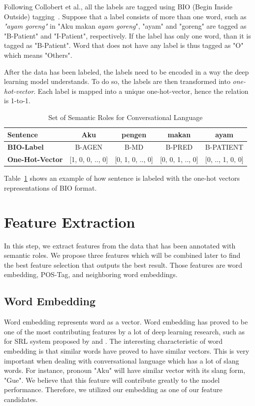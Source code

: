 Following Collobert et al., all the labels are tagged using BIO (Begin Inside Outside) tagging~\cite{collobert2011natural}. Suppose that a label \patient consists of more than one word, such as \textit{"ayam goreng"} in "Aku makan \textit{ayam goreng}", "ayam" and "goreng" are tagged as "B-Patient" and "I-Patient", respectively. If the label has only one word, than it is tagged as "B-Patient". Word that does not have any label is thus tagged as "O" which means "Others".

After the data has been labeled, the labels need to be encoded in a way the deep learning model understands. To do so, the labels are then transformed into \textit{one-hot-vector}. Each label is mapped into a unique one-hot-vector, hence the relation is 1-to-1.
\begin{table}
	\centering
	\caption{Set of Semantic Roles for Conversational Language}
	\label{tab:examplelabel}
	\begin{tabular}{|lcccc|}
		\hline
		\textbf{Sentence} 				& Aku & pengen & makan & ayam \\
		\hline
		\textbf{BIO-Label}				& B-AGEN & B-MD & B-PRED & B-PATIENT  \\
		\hline
		\textbf{One-Hot-Vector}		& [1, 0, 0, .., 0] & [0, 1, 0, .., 0] & [0, 0, 1, .., 0] & [0, .., 1, 0, 0] \\
		\hline
	\end{tabular}
\end{table}

Table~\ref{tab:examplelabel} shows an example of how sentence is labeled with the one-hot vectors representations of BIO format.

\section{Feature Extraction}
In this step, we extract features from the data that has been annotated with semantic roles. We propose three features which will be combined later to find the best feature selection that outputs the best result. Those features are word embedding, POS-Tag, and neighboring word embeddings.

\subsection{Word Embedding}
Word embedding represents word as a vector. Word embedding has proved to be one of the most contributing features by a lot of deep learning research, such as for SRL system proposed by \cite{zhou2015end} and \cite{collobert2011natural}. The interesting characteristic of word embedding is that similar words have proved to have similar vectors. This is very important when dealing with conversational language which has a lot of slang words. For instance, pronoun "Aku" will have similar vector with its slang form, "Gue". We believe that this feature will contribute greatly to the model performance. Therefore, we utilized our embedding as one of our feature candidates.

